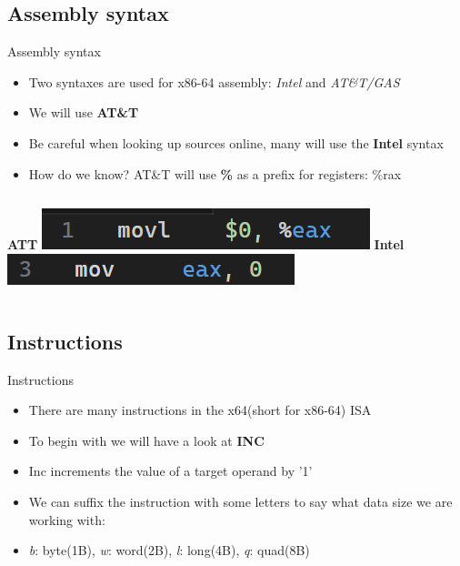 \documentclass[
	11pt, %
	aspectratio=169, %
]{beamer}
\begin{document}
\subsection{Assembly syntax}
\begin{frame}{Assembly syntax}{\sectiontitle}
    \begin{itemize}
        \item Two syntaxes are used for x86-64 assembly: \textit{Intel} and \textit{AT\&T/GAS}
        \item We will use \textbf{AT\&T}
        \item Be careful when looking up sources online, many will use the \textbf{Intel} syntax
        \item How do we know? AT\&T will use \textbf{\%} as a prefix for registers: \%rax
    \end{itemize}
    \begin{columns}
        \textbf{ATT}
        \includegraphics[width=\textwidth]{./images/att-register-access.png}
        \textbf{Intel}
        \includegraphics[width=\textwidth]{./images/intel-register-access.png}
    \end{columns}
\end{frame}

\subsection{Instructions}
\begin{frame}{Instructions}{\sectiontitle}
    \begin{itemize}
        \item There are many instructions in the x64(short for x86-64) ISA
        \item To begin with we will have a look at \textbf{INC}
        \item Inc increments the value of a target operand by '1'
        \item We can suffix the instruction with some letters to say what data size we are working with:
        \item \textit{b}: byte(1B), \textit{w}: word(2B), \textit{l}: long(4B), \textit{q}: quad(8B)
    \end{itemize}
\end{frame}
\end{document}
